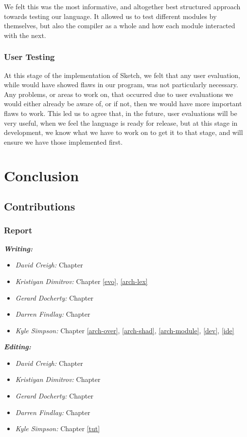 \documentclass{l3proj}
\begin{document}
We felt this was the most informative, and altogether best structured approach towards testing our language. It allowed us to test different modules by themselves, but also the compiler as a whole and how each module interacted with the next.

\subsection{User Testing}
At this stage of the implementation of Sketch, we felt that any user evaluation, while would have showed flaws in our program, was not particularly necessary. Any problems, or areas to work on, that occurred due to user evaluations we would either already be aware of, or if not, then we would have more important flaws to work. This led us to agree that, in the future, user evaluations will be very useful, when we feel the language is ready for release, but at this stage in development, we know what we have to work on to get it to that stage, and will ensure we have those implemented first.
\chapter{Conclusion}
\label{conc}

\section{Contributions}
\label{cont}

\subsection{Report}
\label{cont-report}

\textit{\textbf{Writing:}}
\begin{itemize}
\item \emph{David Creigh:} Chapter
\item \emph{Kristiyan Dimitrov:} Chapter \ref{evo}, \ref{arch-lex}
\item \emph{Gerard Docherty:} Chapter 
\item \emph{Darren Findlay:} Chapter 
\item \emph{Kyle Simpson:} Chapter \ref{arch-over}, \ref{arch-shad}, \ref{arch-module}, \ref{dev}, \ref{ide}
\end{itemize}
\textit{\textbf{Editing:}}
\begin{itemize}
\item \emph{David Creigh:} Chapter 
\item \emph{Kristiyan Dimitrov:} Chapter 
\item \emph{Gerard Docherty:} Chapter 
\item \emph{Darren Findlay:} Chapter 
\item \emph{Kyle Simpson:} Chapter \ref{tut}
\end{itemize}
\end{document}
